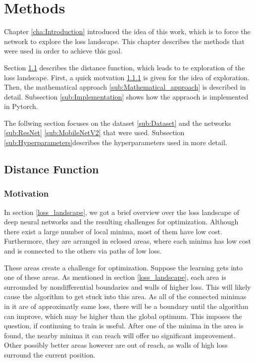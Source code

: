 \chapter{Methods}\label{cha:Methods}

Chapter \ref{cha:Introduction} introduced the idea of this work, which is to
force the network to explore the loss landscape. This chapter describes the
methods that were used in order to achieve this goal. 

Section \ref{seq:Distance} describes the distance function, which leads to te
exploration of the loss landscape. First, a quick motvation \ref{sub:Motivation}
is given for the idea of exploration. Then, the mathematical approach
\ref{sub:Mathematical_approach} is described in detail. Subsection
\ref{sub:Implementation} shows how the appraoch is implemented in Pytorch.

The follwing section focuses on the dataset \ref{sub:Dataset} and the networks
\ref{sub:ResNet} \ref{sub:MobileNetV2} that were used. Subsection
\ref{sub:Hyperparameters}describes the hyperparameters used in more detail.


\section{Distance Function}\label{seq:Distance}
\subsection{Motivation}\label{sub:Motivation}
In section \ref{loss_landscape}, we got a brief overview over the loss landscape
of deep neural networks and the resulting challenges for optimization. Although
there exist a large number of local minima, most of them have low cost.
Furthermore, they are arranged in eclosed areas, where each minima has low cost and is
connected to the others via paths of low loss.

These areas create a challenge for optimization. Suppose the learning gets into
one of these areas. As mentioned in section \ref{loss_landscape}, each area is
surrounded by nondifferential boundaries and walls of higher loss. This will
likely cause the algorithm to get stuck into this area. As all of the connected
minimas in it are of approximatly same loss, there will be a boundary until the
algorithm can improve, which may be higher than the global optimum. This imposes
the question, if continuing to train is useful. After one of the minima in the
area is found, the nearby minima it can reach will offer no significant
improvement. Other possibly better areas however are out of reach, as walls of
high loss surround the current position.

